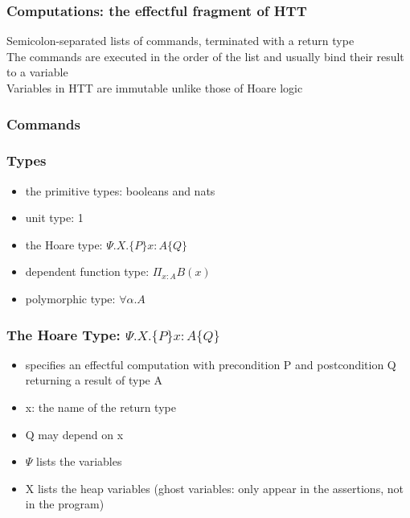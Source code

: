 \documentclass[xcolor=dvipsnames,9pt,hide notes,mathserif]{beamer}
\begin{document}
\begin{frame}
  \frametitle{Computations: the effectful fragment of HTT}
  Semicolon-separated lists of commands, terminated with a return type\\
  The commands are executed in the order of the list and usually bind their result to a variable\\
  Variables in HTT are immutable unlike those of Hoare logic
\end{frame}




\begin{frame}
  \frametitle{Commands}
\end{frame}






\begin{frame}
  \frametitle{Types}
  \begin{itemize}
  \item the primitive types: booleans and nats
  \item unit type: 1
  \item the Hoare type: $\Psi.X.\{P\}x:A\{Q\}$
  \item dependent function type: $\Pi_{x:A} B(x)$
  \item polymorphic type: $\forall \alpha.A$
  \end{itemize}
  
\end{frame}






\begin{frame}
  \frametitle{The Hoare Type: $\Psi.X.\{P\}x{:}A\{Q\}$}
  \begin{itemize}
  \item specifies an effectful computation with precondition P and postcondition Q returning a result of type A
  \item x: the name of the return type
  \item Q may depend on x
  \item $\Psi$ lists the variables
  \item X lists the heap variables  (ghost variables: only appear in the assertions, not in the program)
  \end{itemize}
  
\end{frame}
\end{document}
